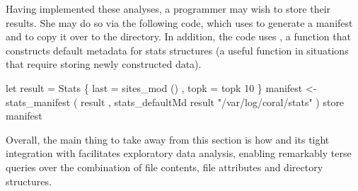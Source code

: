 Having implemented these analyses, a programmer may wish to store their
results.  She may do so via the following code, which
uses  to generate a manifest and 
to copy it over to the  directory.  In addition,
the code uses , a function
that constructs default metadata for stats structures
(a useful function in situations that require storing newly
constructed data).


\begin{code}
let result = Stats \{ last = sites_mod ()
                   , topk = topk 10 \}
manifest <- stats_manifest 
  ( result
  , stats_defaultMd result "/var/log/coral/stats" )
store manifest 
\end{code}



Overall, the main thing to take away from this section is how 
\forest{} and its tight integration with
\haskell{} facilitates exploratory data analysis,
enabling remarkably terse queries over the combination of file
contents, file attributes and directory structures.

